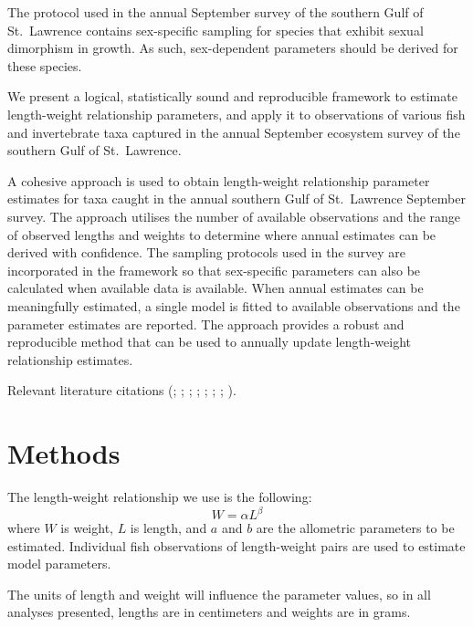 \documentclass[12pt]{article}\usepackage[]{graphicx}\usepackage[]{color}
\begin{document}
The protocol used in the annual September survey of the southern Gulf of St.~Lawrence contains sex-specific sampling for species that exhibit sexual dimorphism in growth. As such, sex-dependent parameters should be derived for these species.

We present a logical, statistically sound and reproducible framework to estimate length-weight relationship parameters, and apply it to observations of various fish and invertebrate taxa captured in the annual September ecosystem survey of the southern Gulf of St.~Lawrence.

A cohesive approach is used to obtain length-weight relationship parameter estimates for taxa caught in the annual southern Gulf of St.~Lawrence September survey. The approach utilises the number of available observations and the range of observed lengths and weights to determine where annual estimates can be derived with confidence. The sampling protocols used in the survey are incorporated in the framework so that sex-specific parameters can also be calculated when available data is available. When annual estimates can be meaningfully estimated, a single model is fitted to available observations and the parameter estimates are reported. The approach provides a robust and reproducible method that can be used to annually update length-weight relationship estimates.

Relevant literature citations (; ; ; ; ; ; ; ).

\section{Methods}\label{methods}

The length-weight relationship we use is the following: \begin{equation}
W = \alpha L^{\beta}
\end{equation} where \(W\) is weight, \(L\) is length, and \(a\) and \(b\) are the allometric parameters to be estimated.
Individual fish observations of length-weight pairs are used to estimate model parameters.

The units of length and weight will influence the parameter values, so in all analyses presented, lengths are in centimeters and weights are in grams.
\end{document}
